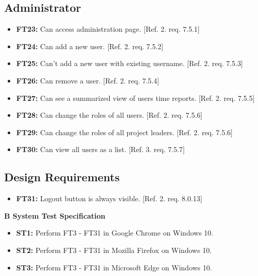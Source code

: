 \documentclass{article}
\begin{document}
		\subsection{Administrator}
		
			\begin{itemize}
			
	
			\item \textbf{FT23:} Can access administration page. [Ref. 2. req. 7.5.1]			
			
  			\item \textbf{FT24:} Can add a new user. [Ref. 2. req. 7.5.2]
  		
  			\item \textbf{FT25:} Can't add a new user with existing username. [Ref. 2. req. 7.5.3]

  			\item \textbf{FT26:} Can remove a user. [Ref. 2. req. 7.5.4]
  			
  			\item \textbf{FT27:} Can see a summarized view of users time reports. [Ref. 2. req. 7.5.5]  		  			
  			\item \textbf{FT28:} Can change the roles of all users. [Ref. 2. req. 7.5.6]
  			
  			\item \textbf{FT29:} Can change the roles of all project leaders. [Ref. 2. req. 7.5.6]
  			
  			\item \textbf{FT30:} Can view all users as a list. [Ref. 3. req. 7.5.7]

		\end{itemize}
		
		\subsection{Design Requirements}
		
		\begin{itemize}
  			
  			\item \textbf{FT31:} Logout button is always visible. [Ref. 2. req. 8.0.13]

		\end{itemize}
		
		\newpage
		\begin{flushleft}
		{\large \textbf{B System Test Specification}}
		\end{flushleft}
		
		
		
		\begin{itemize}
		
  			\item \textbf{ST1:} Perform FT3 - FT31 in Google Chrome on Windows 10. 	
  			
  			\item \textbf{ST2:} Perform FT3 - FT31 in Mozilla Firefox on Windows 10. 
  			
  			\item \textbf{ST3:} Perform FT3 - FT31 in Microsoft Edge on Windows 10. 					
  			
  			
		\end{itemize}
		
\end{document}
